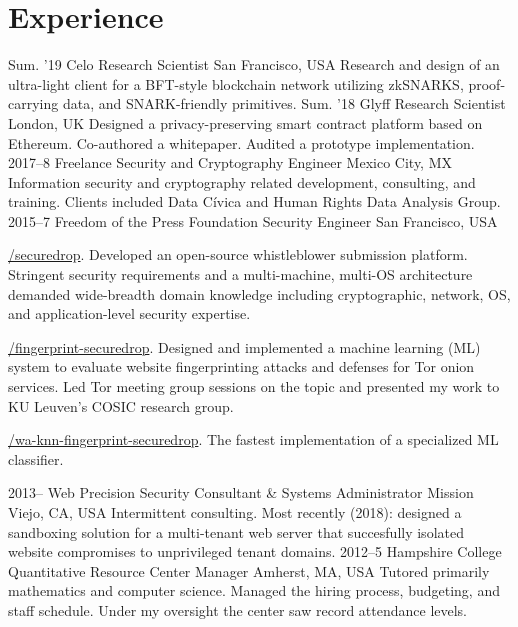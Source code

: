 \documentclass[]{fowlslegs-cv}
\newcommand\makeIcon[1]{%
    \raisebox{-1pt}{%
        \texttt{[image: icons/\#1]}%
    }%
}
\begin{document}
\section{Experience}
\begin{entrylist}
\entry
{Sum. '19}
{Celo}
{Research Scientist}
{San Francisco, USA}
{Research and design of an ultra-light client for a BFT-style blockchain network
utilizing zkSNARKS, proof-carrying data, and SNARK-friendly primitives.}
\entry
{Sum. '18}
{Glyff}
{Research Scientist}
{London, UK}
{Designed a privacy-preserving smart contract platform based on Ethereum.
Co-authored a whitepaper. Audited a prototype implementation.}
\entry
{2017--8}
{Freelance}
{Security and Cryptography Engineer}
{Mexico City, MX}
{Information security and cryptography related development, consulting, and
training. Clients included Data Cívica and Human Rights Data Analysis Group.}
\entry
{2015--7}
{Freedom of the Press Foundation}
{Security Engineer}
{San Francisco, USA}
{\makeIcon{github}
  \href{https://github.com/freedomofpress/securedrop}{/securedrop}. Developed
  an open-source whistleblower submission platform. Stringent security
  requirements and a multi-machine, multi-OS architecture demanded
  wide-breadth domain knowledge including cryptographic, network, OS, and
  application-level security expertise. \\
  \makeIcon{github}
  \href{https://github.com/freedomofpress/fingerprint-securedrop}{/fingerprint-securedrop}.
  Designed and implemented a machine learning (ML) system to evaluate website
  fingerprinting attacks and defenses for Tor onion services. Led Tor meeting
  group sessions on the topic and presented my work to KU Leuven's COSIC
  research group. \\
  \makeIcon{github}
  \href{https://github.com/freedomofpress/wa-knn-fingerprint-securedrop}{/wa-knn-fingerprint-securedrop}.
  The fastest implementation of a specialized ML classifier.}
\entry
{2013--}
{Web Precision}
{Security Consultant \& Systems Administrator}
{Mission Viejo, CA, USA}
{Intermittent consulting. Most recently (2018): designed a sandboxing solution for a multi-tenant web server that succesfully isolated website compromises to unprivileged tenant domains.}
\entry
{2012--5}
{Hampshire College Quantitative Resource Center}
{Manager}
{Amherst, MA, USA}
{Tutored primarily mathematics and computer science. Managed the hiring process,
budgeting, and staff schedule. Under my oversight the center saw record
attendance levels.}
\end{entrylist}
\end{document}
